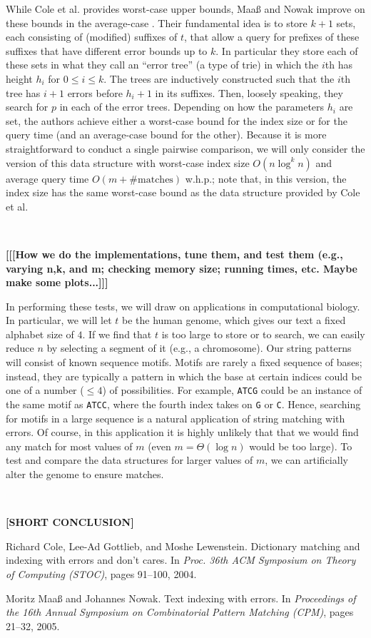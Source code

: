 \documentclass[11pt]{article}
\begin{document}
While Cole et al. provides worst-case upper bounds, Maa{\ss} and Nowak improve on these bounds in the average-case \cite{maas}.
Their fundamental idea is to store $k+1$ sets, each consisting of (modified) suffixes of $t$, that allow a query for prefixes of these suffixes that have different error bounds up to $k$.
In particular they store each of these sets in what they call an ``error tree'' (a type of trie) in which the $i$th has height $h_i$ for $0 \leq i \leq k$.
The trees are inductively constructed such that the $i$th tree has $i+1$ errors before $h_i + 1$ in its suffixes.
Then, loosely speaking, they search for $p$ in each of the error trees.
Depending on how the parameters $h_i$ are set, the authors achieve either a worst-case bound for the index size or for the query time (and an average-case bound for the other).
Because it is more straightforward to conduct a single pairwise comparison, we will only consider the version of this data structure with worst-case index size $O(n \log^k n)$ and average query time $O(m + \text{\# matches})$ w.h.p.; note that, in this version, the index size has the same worst-case bound as the data structure provided by Cole et al.

\

\textbf{[[[How we do the implementations, tune them, and test them (e.g., varying n,k, and m; checking memory size; running times, etc. Maybe make some plots...]]]}

In performing these tests, we will draw on applications in computational biology.
In particular, we will let $t$ be the human genome, which gives our text a fixed alphabet size of $4$.
If we find that $t$ is too large to store or to search, we can easily reduce $n$ by selecting a segment of it (e.g., a chromosome).
Our string patterns will consist of known sequence motifs.
Motifs are rarely a fixed sequence of bases; instead, they are typically a pattern in which the base at certain indices could be one of a number ($\leq 4$) of possibilities.
For example, \texttt{ATCG} could be an instance of the same motif as \texttt{ATCC}, where the fourth index takes on \texttt{G} or \texttt{C}.
Hence, searching for motifs in a large sequence is a natural application of string matching with errors.
Of course, in this application it is highly unlikely that that we would find any match for most values of $m$ (even $m = \Theta(\log n)$ would be too large).
To test and compare the data structures for larger values of $m$, we can artificially alter the genome to ensure matches.

\

\textbf{[SHORT CONCLUSION]}


\begin{thebibliography}{9}
Richard Cole, Lee-Ad Gottlieb, and Moshe Lewenstein.
 Dictionary matching and indexing with errors and don't cares.
 In \textit{Proc. 36th ACM Symposium on Theory of Computing (STOC)},
 pages 91--100, 2004.
 
Moritz Maa{\ss} and Johannes Nowak.
 Text indexing with errors.
 In \textit{Proceedings of the 16th Annual Symposium on Combinatorial Pattern Matching (CPM)},
 pages 21--32, 2005.
 
\end{thebibliography}
\end{document}
